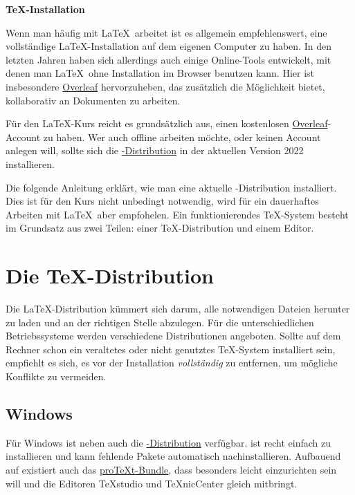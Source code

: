 \documentclass[
	ausgabe=2023-02-08,
	titel=Installationshinweise,
	shortverb=true,
]{../tex/latexkurs-exercise}
\begin{document}
\begin{center}
\sffamily\bfseries\Large \TeX-Installation
\end{center}

\noindent Wenn man häufig mit \LaTeX\ arbeitet ist es allgemein empfehlenswert, eine vollständige \LaTeX-Installation auf dem eigenen Computer zu haben. In den letzten Jahren haben sich allerdings auch einige Online-Tools entwickelt, mit denen man \LaTeX\ ohne Installation im Browser benutzen kann. Hier ist insbesondere \href{https://qn3.de/tex00}{Overleaf} hervorzuheben, das zusätzlich die Möglichkeit bietet, kollaborativ an Dokumenten zu arbeiten.

Für den \LaTeX-Kurs reicht es grundsätzlich aus, einen kostenlosen \href{https://qn3.de/tex00}{Overleaf}-Account zu haben. Wer auch offline arbeiten möchte, oder keinen Account anlegen will, sollte sich die \href{https://www.tug.org/texlive/}{\TeXlive-Distribution} in der aktuellen Version 2022 installieren.

Die folgende Anleitung erklärt, wie man eine aktuelle \TeXlive-Distribution installiert. Dies ist für den Kurs nicht unbedingt notwendig, wird für ein dauerhaftes Arbeiten mit \LaTeX\ aber empfohelen. Ein funktionierendes \TeX-System besteht im Grundsatz aus zwei Teilen: einer \TeX-Distribution und einem Editor.


\section{Die \TeX-Distribution}



Die \LaTeX-Distribution kümmert sich darum, alle notwendigen Dateien herunter zu laden und an der richtigen Stelle abzulegen. Für die unterschiedlichen Betriebssysteme werden verschiedene Distributionen angeboten. Sollte auf dem Rechner schon ein veraltetes oder nicht genutztes \TeX-System installiert sein, empfiehlt es sich, es vor der Installation \emph{vollständig} zu entfernen, um mögliche Konflikte zu vermeiden.

\subsection*{Windows}
Für Windows ist neben \href{https://www.tug.org/texlive/}{\TeXlive} auch die \href{https://miktex.org/}{\MikTeX-Distribution} verfügbar. \MikTeX ist recht einfach zu installieren und kann fehlende Pakete automatisch nachinstallieren. Aufbauend auf \MikTeX existiert auch das \href{https://www.tug.org/protext/}{pro\TeX t-Bundle}, dass besonders leicht einzurichten sein will und die Editoren \TeX studio und \TeX nicCenter gleich mitbringt.
\end{document}
